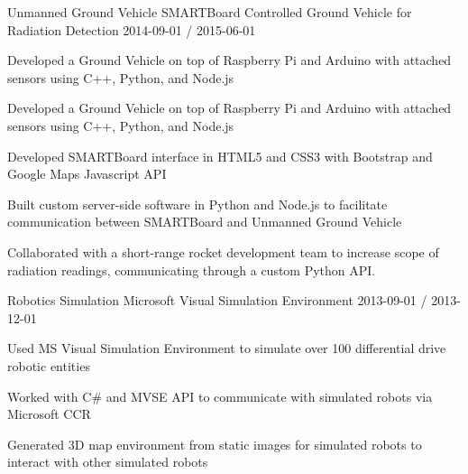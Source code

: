 \begin{cventries}
 
  \cventry
    {Unmanned Ground Vehicle}
    {SMARTBoard Controlled Ground Vehicle for Radiation Detection}
    {}
    {2014-09-01 / 2015-06-01}
    {
          \begin{cvitems}
                \item{Developed a Ground Vehicle on top of Raspberry Pi and Arduino with attached sensors using C++, Python, and Node.js}
                    \begin{cvitemssub}
                        \item{Developed a Ground Vehicle on top of Raspberry Pi and Arduino with attached sensors using C++, Python, and Node.js}
                    \end{cvitemssub}
                \item{Developed SMARTBoard interface in HTML5 and CSS3 with Bootstrap and Google Maps Javascript API}
                \item{Built custom server-side software in Python and Node.js to facilitate communication between SMARTBoard and Unmanned Ground Vehicle}
                \item{Collaborated with a short-range rocket development team to increase scope of radiation readings, communicating through a custom Python API.}
          \end{cvitems}
    }
 
  \cventry
    {Robotics Simulation}
    {Microsoft Visual Simulation Environment}
    {}
    {2013-09-01 / 2013-12-01}
    {
          \begin{cvitems}
                \item{Used MS Visual Simulation Environment to simulate over 100 differential drive robotic entities}
                \item{Worked with C\# and MVSE API to communicate with simulated robots via Microsoft CCR}
                \item{Generated 3D map environment from static images for simulated robots to interact with other simulated robots}
          \end{cvitems}
    }
 

\end{cventries}

